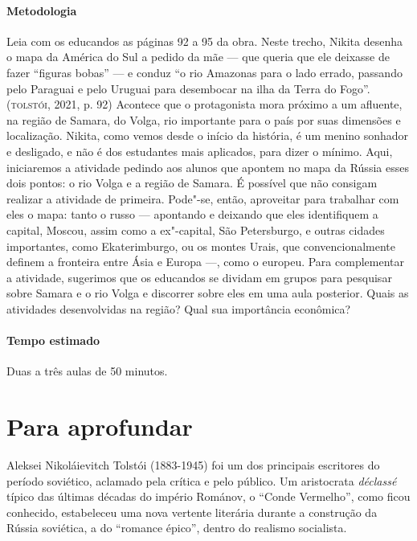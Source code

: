 \documentclass[11pt]{extarticle}
\begin{document}
\paragraph{Metodologia}
Leia com os educandos as páginas 92 a 95 da obra. Neste trecho, Nikita
desenha o mapa da América do Sul a pedido da mãe --- que queria que ele
deixasse de fazer ``figuras bobas'' --- e conduz ``o rio Amazonas para o
lado errado, passando pelo Paraguai e pelo Uruguai para desembocar na
ilha da Terra do Fogo''. (\textsc{tolstói}, 2021, p. 92) Acontece que o protagonista mora
próximo a um afluente, na região de Samara, do Volga, rio
importante para o país por suas dimensões e localização. Nikita,
como vemos desde o início da história, é um menino sonhador e desligado,
e não é dos estudantes mais aplicados, para dizer o mínimo. Aqui,
iniciaremos a atividade pedindo aos alunos que apontem no mapa da Rússia
esses dois pontos: o rio Volga e a região de Samara. É possível que não
consigam realizar a atividade de primeira. Pode"-se, então, aproveitar
para trabalhar com eles o mapa: tanto o russo --- apontando e deixando
que eles identifiquem a capital, Moscou, assim como a ex"-capital, São
Petersburgo, e outras cidades importantes, como Ekaterimburgo, ou os
montes Urais, que convencionalmente definem a fronteira entre Ásia e
Europa ---, como o europeu. Para complementar a atividade, sugerimos que
os educandos se dividam em grupos para pesquisar sobre Samara e o rio
Volga e discorrer sobre eles em uma aula posterior. Quais as atividades
desenvolvidas na região? Qual sua importância econômica?

\paragraph{Tempo estimado} Duas a três aulas de 50 minutos.

\section{Para aprofundar}

Aleksei Nikoláievitch Tolstói
(1883-1945) foi um dos principais escritores do período soviético,
aclamado pela crítica e pelo público. Um aristocrata \emph{déclassé}
típico das últimas décadas do império Románov, o ``Conde Vermelho'',
como ficou conhecido, estabeleceu uma nova vertente literária durante a
construção da Rússia soviética, a do ``romance épico'', dentro do
realismo socialista.

\end{document}
